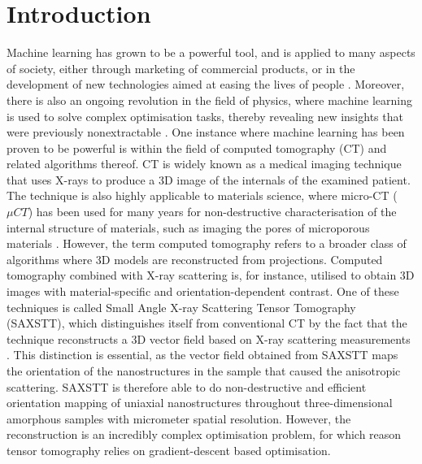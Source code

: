 \chapter{Introduction}


Machine learning has grown to be a powerful tool, and is applied to many aspects of society,
either through marketing of commercial products, or in the development of new technologies aimed at easing the lives of people \cite{Goodfellow-et-al-2016}.
Moreover, there is also an ongoing revolution in the field of physics,
where machine learning is used to solve complex optimisation tasks, thereby revealing new insights that were previously nonextractable \cite{carleo2019machine}.
One instance where machine learning has been proven to be powerful is within the field of computed tomography (CT) and related algorithms thereof.
CT is widely known as a medical imaging technique that uses X-rays to produce a 3D image of the internals of the examined patient.
The technique is also highly applicable to materials science, where micro-CT ($\mu CT$) has been used for many years for non-destructive characterisation of the internal structure of materials, such as imaging the pores of microporous materials \cite{orhan2020micro}.
However, the term computed tomography refers to a broader class of algorithms where 3D models are reconstructed from projections.
Computed tomography combined with X-ray scattering is, for instance, utilised to obtain 3D images with material-specific and orientation-dependent contrast.
One of these techniques is called Small Angle X-ray Scattering Tensor Tomography (SAXSTT), which distinguishes itself from conventional CT by the fact that the technique
reconstructs a 3D vector field based on X-ray scattering measurements \cite{liebi2015nanostructure}.
This distinction is essential, as the vector field obtained from SAXSTT maps the orientation of the nanostructures in the sample that caused the anisotropic scattering.
SAXSTT is therefore able to do non-destructive and efficient orientation mapping of uniaxial nanostructures throughout three-dimensional amorphous samples with micrometer spatial resolution.
However, the reconstruction is an incredibly complex optimisation problem, for which reason tensor tomography relies on gradient-descent based optimisation.

